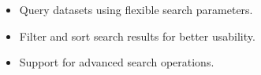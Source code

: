 \documentclass[letterpaper,10pt,english]{sphinxmanual}
\begin{document}
\subsubsection*{}
\begin{itemize}
\item {} 
\sphinxAtStartPar
Query datasets using flexible search parameters.

\item {} 
\sphinxAtStartPar
Filter and sort search results for better usability.

\item {} 
\sphinxAtStartPar
Support for advanced search operations.

\end{itemize}
\end{document}
